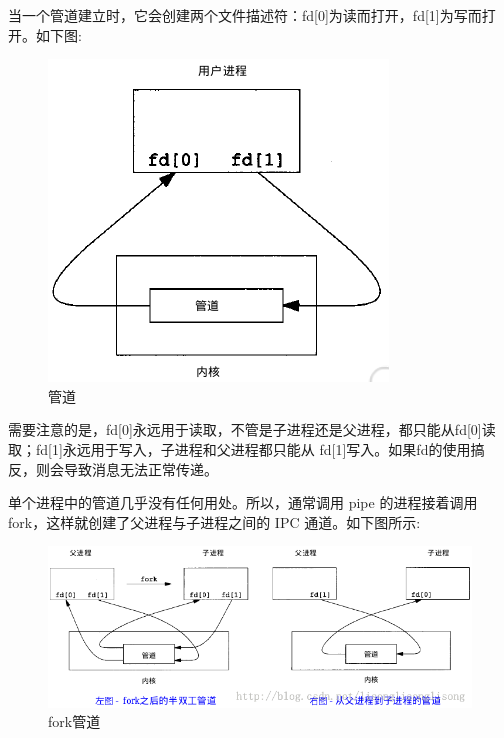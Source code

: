 当一个管道建立时，它会创建两个文件描述符：fd[0]为读而打开，fd[1]为写而打开。如下图:
\begin{figure}[H]
  \centering
  \includegraphics[width=\linewidth]{pipe.png}
  \caption{管道}
  \label{fig:pipe}
\end{figure}
需要注意的是，fd[0]永远用于读取，不管是子进程还是父进程，都只能从fd[0]读取；fd[1]永远用于写入，子进程和父进程都只能从
fd[1]写入。如果fd的使用搞反，则会导致消息无法正常传递。

单个进程中的管道几乎没有任何用处。所以，通常调用 pipe 的进程接着调用 fork，这样就创建了父进程与子进程之间的 IPC 通道。如下图所示:
\begin{figure}[H]
  \centering
  \includegraphics[width=\linewidth]{fork_pipe.png}
  \caption{fork管道}
  \label{fig:fork_pipe}
\end{figure}

